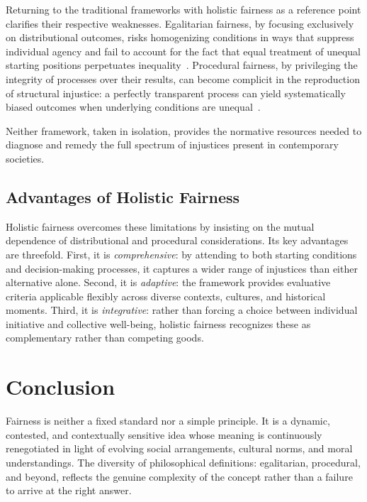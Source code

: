 \documentclass[11pt,showkeys]{../../shared/essay}
\begin{document}
Returning to the traditional frameworks with holistic fairness as a reference point clarifies their respective weaknesses. Egalitarian fairness, by focusing exclusively on distributional outcomes, risks homogenizing conditions in ways that suppress individual agency and fail to account for the fact that equal treatment of unequal starting positions perpetuates inequality~\cite{temkin_equality_2019,afolayan_egalitarianism_2015}. Procedural fairness, by privileging the integrity of processes over their results, can become complicit in the reproduction of structural injustice: a perfectly transparent process can yield systematically biased outcomes when underlying conditions are unequal~\cite{macdonald_judicial_1980,galligan_procedural_1997}.

Neither framework, taken in isolation, provides the normative resources needed to diagnose and remedy the full spectrum of injustices present in contemporary societies.

\subsection{Advantages of Holistic Fairness}

Holistic fairness overcomes these limitations by insisting on the mutual dependence of distributional and procedural considerations. Its key advantages are threefold. First, it is \textit{comprehensive}: by attending to both starting conditions and decision-making processes, it captures a wider range of injustices than either alternative alone. Second, it is \textit{adaptive}: the framework provides evaluative criteria applicable flexibly across diverse contexts, cultures, and historical moments. Third, it is \textit{integrative}: rather than forcing a choice between individual initiative and collective well-being, holistic fairness recognizes these as complementary rather than competing goods.

\section{Conclusion}

Fairness is neither a fixed standard nor a simple principle. It is a dynamic, contested, and contextually sensitive idea whose meaning is continuously renegotiated in light of evolving social arrangements, cultural norms, and moral understandings. The diversity of philosophical definitions: egalitarian, procedural, and beyond, reflects the genuine complexity of the concept rather than a failure to arrive at the right answer.
\end{document}
